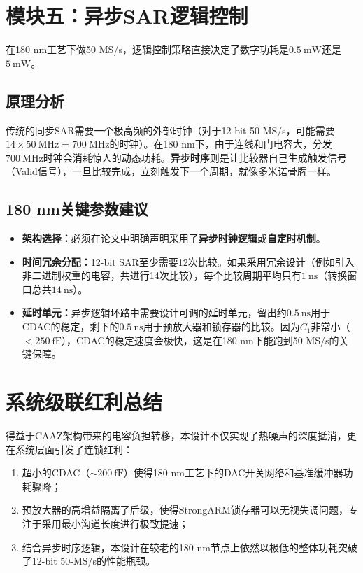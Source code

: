 \documentclass[11pt,a4paper,UTF8]{ctexart}
\begin{document}
\section{模块五：异步SAR逻辑控制}

在180 nm工艺下做50 MS/s，逻辑控制策略直接决定了数字功耗是$\SI{0.5}{\milli\watt}$还是$\SI{5}{\milli\watt}$。

\subsection{原理分析}

传统的同步SAR需要一个极高频的外部时钟（对于12-bit 50 MS/s，可能需要$14 \times \SI{50}{\mega\hertz} = \SI{700}{\mega\hertz}$的时钟）。在180 nm下，由于连线和门电容大，分发$\SI{700}{\mega\hertz}$时钟会消耗惊人的动态功耗。\textbf{异步时序}则是让比较器自己生成触发信号（Valid信号），一旦比较完成，立刻触发下一个周期，就像多米诺骨牌一样。

\subsection{180 nm关键参数建议}

\begin{itemize}[leftmargin=*]
    \item \textbf{架构选择：}必须在论文中明确声明采用了\textbf{异步时钟逻辑}或\textbf{自定时机制}。
    
    \item \textbf{时间冗余分配：}12-bit SAR至少需要12次比较。如果采用冗余设计（例如引入非二进制权重的电容，共进行14次比较），每个比较周期平均只有$\SI{1}{\nano\second}$（转换窗口总共$\SI{14}{\nano\second}$）。
    
    \item \textbf{延时单元：}异步逻辑环路中需要设计可调的延时单元，留出约$\SI{0.5}{\nano\second}$用于CDAC的稳定，剩下的$\SI{0.5}{\nano\second}$用于预放大器和锁存器的比较。因为$C_1$非常小（$<\SI{250}{\femto\farad}$），CDAC的稳定速度会极快，这是在180 nm下能跑到50 MS/s的关键保障。
\end{itemize}

\section{系统级联红利总结}

得益于CAAZ架构带来的电容负担转移，本设计不仅实现了热噪声的深度抵消，更在系统层面引发了连锁红利：

\begin{enumerate}[leftmargin=*]
    \item 超小的CDAC（$\sim\SI{200}{\femto\farad}$）使得180 nm工艺下的DAC开关网络和基准缓冲器功耗骤降；
    
    \item 预放大器的高增益隔离了后级，使得StrongARM锁存器可以无视失调问题，专注于采用最小沟道长度进行极致提速；
    
    \item 结合异步时序逻辑，本设计在较老的180 nm节点上依然以极低的整体功耗突破了12-bit 50-MS/s的性能瓶颈。
\end{enumerate}
\end{document}
